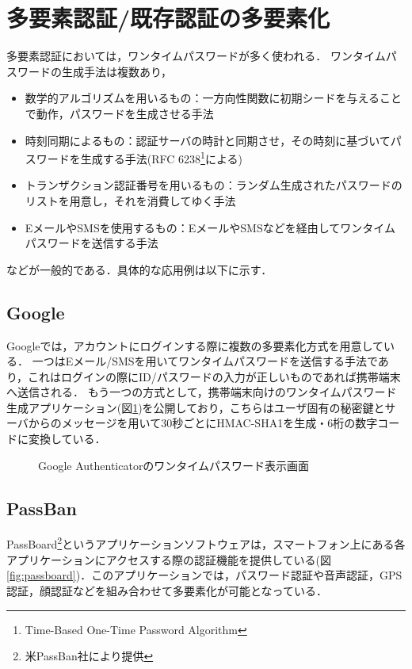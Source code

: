 \section{多要素認証/既存認証の多要素化}\label{sec:multifactor}
多要素認証においては，ワンタイムパスワードが多く使われる．
ワンタイムパスワードの生成手法は複数あり，
\begin{itemize}
\item 数学的アルゴリズムを用いるもの：一方向性関数に初期シードを与えることで動作，パスワードを生成させる手法
\item 時刻同期によるもの：認証サーバの時計と同期させ，その時刻に基づいてパスワードを生成する手法(RFC 6238\footnote{Time-Based One-Time Password Algorithm}による)
\item トランザクション認証番号を用いるもの：ランダム生成されたパスワードのリストを用意し，それを消費してゆく手法
\item EメールやSMSを使用するもの：EメールやSMSなどを経由してワンタイムパスワードを送信する手法
\end{itemize}
などが一般的である．具体的な応用例は以下に示す．

\subsection{Google}
Googleでは，アカウントにログインする際に複数の多要素化方式を用意している．
一つはEメール/SMSを用いてワンタイムパスワードを送信する手法であり，これはログインの際にID/パスワードの入力が正しいものであれば携帯端末へ送信される．
もう一つの方式として，携帯端末向けのワンタイムパスワード生成アプリケーション(図\ref{fig:googleAuthenticator})を公開しており，こちらはユーザ固有の秘密鍵とサーバからのメッセージを用いて30秒ごとにHMAC-SHA1を生成・6桁の数字コードに変換している．

\begin{figure}[ht]
  \begin{center}
  \end{center}
  \caption{Google Authenticatorのワンタイムパスワード表示画面}
  \label{fig:googleAuthenticator}
\end{figure}

\subsection{PassBan}
PassBoard\footnote{米PassBan社により提供}というアプリケーションソフトウェアは，スマートフォン上にある各アプリケーションにアクセスする際の認証機能を提供している(図\ref{fig:passboard})．このアプリケーションでは，パスワード認証や音声認証，GPS認証，顔認証などを組み合わせて多要素化が可能となっている．

